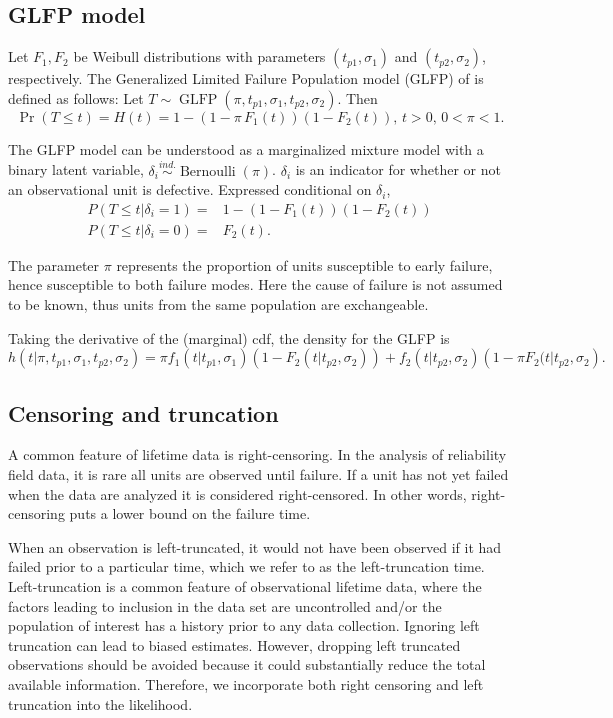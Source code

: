 \documentclass[aoas]{imsart}
\newcommand{\ind}{\stackrel{ind.}{\sim}}
\newcommand{\op}{\operatorname}
\begin{document}
\subsection{GLFP model}
\label{subsec:GLFP model}
Let $F_1,F_2$ be Weibull distributions with parameters $(t_{p1},\sigma_1)$ and $(t_{p2}, \sigma_2)$, respectively.
The Generalized Limited Failure Population model (GLFP) of \citet{chan} is defined as follows: Let $T \sim \op{GLFP}(\pi, t_{p1},\sigma_1,t_{p2},\sigma_2)$. Then
$$\Pr(T \le t) = H(t) = 1 - (1-\pi\, F_{1}(t))(1 - F_{2}(t)),\, t>0,\, 0 < \pi < 1.$$

The GLFP model can be understood as a marginalized mixture model with a binary latent variable, $\delta_i\ind \op{Bernoulli}(\pi)$. $\delta_i$ is an indicator for whether or not an observational unit is defective. Expressed conditional on $\delta_i$,
\begin{align*}
P(T\le t | \delta_i=1) =& 1 -(1-F_1(t))(1-F_2(t))\\
P(T\le t | \delta_i=0) =& F_2(t).
\end{align*}

 
The parameter $\pi$ represents the proportion of units susceptible to early failure, hence susceptible to both failure modes. Here the cause of failure is not assumed to be known, thus units from the same population are exchangeable.

Taking the derivative of the (marginal) cdf, the density for the GLFP is
\begin{equation}
h(t|\pi, t_{p1},\sigma_1, t_{p2}, \sigma_2) = \pi f_1(t|t_{p1},\sigma_1)\left(1-F_2(t|t_{p2},\sigma_2)\right) + f_2(t|t_{p2},\sigma_2)\left(1-\pi F_2(t|t_{p2},\sigma_2\right).
\end{equation}

\subsection{Censoring and truncation}
A common feature of lifetime data is right-censoring. In the analysis of reliability field data, it is rare all units are observed until failure. If a unit has not yet failed when the data are analyzed it is considered right-censored.  In other words, right-censoring puts a lower bound on the failure time.


When an observation is left-truncated, it would not have been observed if it had failed prior to a particular time, which we refer to as the left-truncation time.  Left-truncation is a common feature of observational lifetime data, where the factors leading to inclusion in the data set are uncontrolled and/or the population of interest has a history prior to any data collection. Ignoring left truncation can lead to biased estimates. However, dropping left truncated observations should be avoided because it could substantially reduce the total available information.  Therefore, we incorporate both right censoring and left truncation into the likelihood. 
\end{document}
